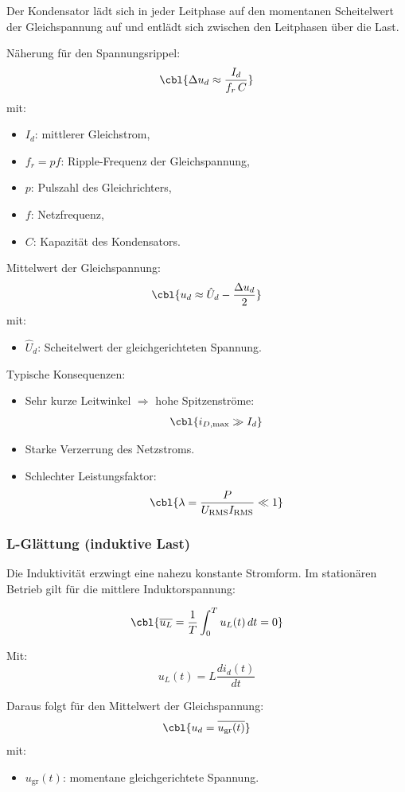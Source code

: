 Der Kondensator lädt sich in jeder Leitphase auf den momentanen Scheitelwert
der Gleichspannung auf und entlädt sich zwischen den Leitphasen über die Last.

Näherung für den Spannungsrippel:
\[
\cbl{\Delta u_d \approx \frac{I_d}{f_r \, C}}
\]
mit:
\begin{itemize}
\item $I_d$: mittlerer Gleichstrom,
\item $f_r = p f$: Ripple-Frequenz der Gleichspannung,
\item $p$: Pulszahl des Gleichrichters,
\item $f$: Netzfrequenz,
\item $C$: Kapazität des Kondensators.
\end{itemize}

Mittelwert der Gleichspannung:
\[
\cbl{u_d \approx \hat U_d - \frac{\Delta u_d}{2}}
\]
mit:
\begin{itemize}
\item $\hat U_d$: Scheitelwert der gleichgerichteten Spannung.
\end{itemize}

Typische Konsequenzen:
\begin{itemize}
\item Sehr kurze Leitwinkel $\Rightarrow$ hohe Spitzenströme:
\[
\cbl{i_{D,\max} \gg I_d}
\]
\item Starke Verzerrung des Netzstroms.
\item Schlechter Leistungsfaktor:
\[
\cbl{\lambda = \frac{P}{U_{\mathrm{RMS}} I_{\mathrm{RMS}}} \ll 1}
\]
\end{itemize}

\subsubsection*{L-Glättung (induktive Last)}

Die Induktivität erzwingt eine nahezu konstante Stromform.
Im stationären Betrieb gilt für die mittlere Induktorspannung:

\[
\cbl{\overline{u_L} = \frac{1}{T}\int_0^T u_L(t)\, dt = 0}
\]

Mit:
\[
u_L(t) = L \frac{di_d(t)}{dt}
\]

Daraus folgt für den Mittelwert der Gleichspannung:
\[
\cbl{u_d = \overline{u_{\mathrm{gr}}(t)}}
\]
mit:
\begin{itemize}
\item $u_{\mathrm{gr}}(t)$: momentane gleichgerichtete Spannung.
\end{itemize}

